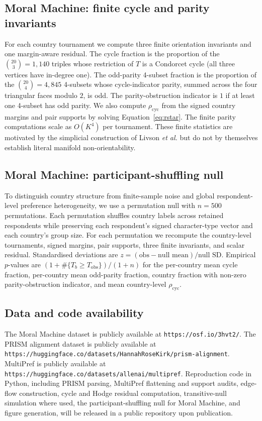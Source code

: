 \documentclass[10pt]{article}
\theoremstyle{definition}
\theoremstyle{remark}
\begin{document}
\subsection*{Moral Machine: finite cycle and parity invariants}

For each country tournament we compute three finite orientation invariants and one margin-aware residual. The cycle fraction is the proportion of the $\binom{20}{3}=1{,}140$ triples whose restriction of $T$ is a Condorcet cycle (all three vertices have in-degree one). The odd-parity 4-subset fraction is the proportion of the $\binom{20}{4}=4{,}845$ 4-subsets whose cycle-indicator parity, summed across the four triangular faces modulo $2$, is odd. The parity-obstruction indicator is $1$ if at least one 4-subset has odd parity. We also compute $\rho_{\mathrm{cyc}}$ from the signed country margins and pair supports by solving Equation~\eqref{eq:rstar}. The finite parity computations scale as $O(K^{4})$ per tournament. These finite statistics are motivated by the simplicial construction of Livson \emph{et al.}\cite{livson2026} but do not by themselves establish literal manifold non-orientability.

\subsection*{Moral Machine: participant-shuffling null}

To distinguish country structure from finite-sample noise and global respondent-level preference heterogeneity, we use a permutation null with $n=500$ permutations. Each permutation shuffles country labels across retained respondents while preserving each respondent's signed character-type vector and each country's group size. For each permutation we recompute the country-level tournaments, signed margins, pair supports, three finite invariants, and scalar residual. Standardised deviations are $z=(\text{obs}-\text{null mean})/\text{null SD}$. Empirical $p$-values are $(1+\#\{T_b\geq T_{\mathrm{obs}}\})/(1+n)$ for the per-country mean cycle fraction, per-country mean odd-parity fraction, country fraction with non-zero parity-obstruction indicator, and mean country-level $\rho_{\mathrm{cyc}}$.

\subsection*{Data and code availability}

The Moral Machine dataset is publicly available at \texttt{https://osf.io/3hvt2/}\cite{awad2018}. The PRISM alignment dataset is publicly available at \texttt{https://huggingface.co/datasets/HannahRoseKirk/prism-alignment}\cite{kirk2024}. MultiPref is publicly available at \texttt{https://huggingface.co/datasets/allenai/multipref}\cite{miranda2025}. Reproduction code in Python, including PRISM parsing, MultiPref flattening and support audits, edge-flow construction, cycle and Hodge residual computation, transitive-null simulation where used, the participant-shuffling null for Moral Machine, and figure generation, will be released in a public repository upon publication.
\end{document}
